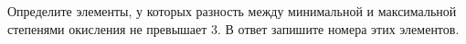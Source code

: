 Определите элементы, у которых разность между минимальной и максимальной степенями окисления не превышает 3. В ответ запишите номера этих элементов.
